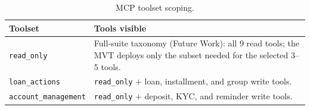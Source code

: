 \documentclass[12pt,a4paper]{report}
\newcommand{\tableheadcolor}{\rowcolor{TableHeadBg}}
\begin{document}
\begin{table}[H]
\centering
\caption[MCP toolset scoping]{MCP toolset scoping.}
\label{tab:agent-toolsets}
\begin{tabular}{p{3.5cm}p{9cm}}
\toprule
\tableheadcolor
\textbf{Toolset} & \textbf{Tools visible} \\
\midrule
\texttt{read\_only} & Full-suite taxonomy (Future Work): all 9 read tools; the MVT deploys only the subset needed for the selected 3--5 tools. \\
\texttt{loan\_actions} & \texttt{read\_only} $+$ loan, installment, and group write tools. \\
\texttt{account\_management} & \texttt{read\_only} $+$ deposit, KYC, and reminder write tools. \\
\bottomrule
\end{tabular}
\end{table}

%
%
%
\end{document}
